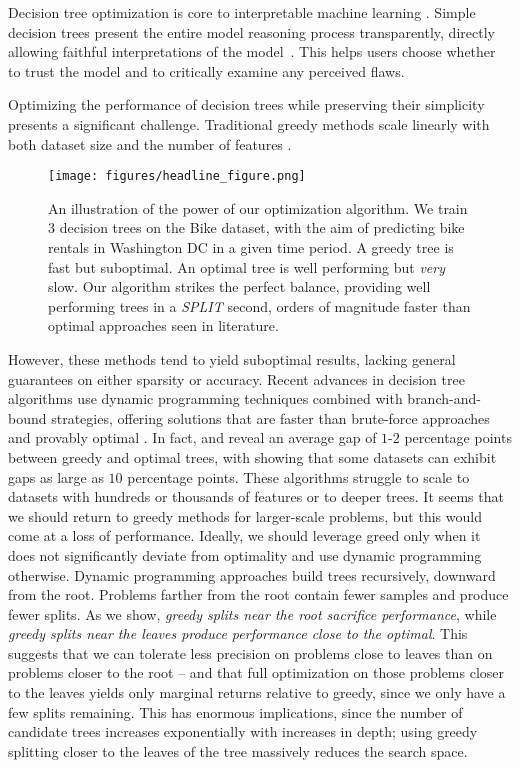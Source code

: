 
Decision tree optimization is core to interpretable machine learning \citep{rudin2022interpretable}. Simple decision trees present the entire model reasoning process transparently, directly allowing faithful interpretations of the model~\citep{arrieta2020explainable}. This helps users choose whether to trust the model and to critically examine any perceived flaws.


Optimizing the performance of decision trees while preserving their simplicity presents a significant challenge. Traditional greedy methods scale linearly with both dataset size and the number of features \citep{breiman1984classification, quinlan2014c45}. 
\begin{figure}[H]
    \centering
    \texttt{[image: figures/headline\_figure.png]}
    \caption{An illustration of the power of our optimization algorithm. We train $3$ decision trees on the Bike dataset, with the aim of predicting bike rentals in Washington DC in a given time period. A greedy tree is fast but suboptimal. An optimal tree is well performing but \textit{very} slow. Our algorithm strikes the perfect balance, providing well performing trees in a \textit{SPLIT} second, orders of magnitude faster than optimal approaches seen in literature.}
    \label{fig:headline_figure}
\end{figure}
However, these methods tend to yield suboptimal results, lacking general guarantees on either sparsity or accuracy. Recent advances in decision tree algorithms use dynamic programming techniques combined with branch-and-bound strategies, offering solutions that are faster than brute-force approaches and provably optimal \citep{gosdt, dl85,murtree, gosdt_guesses}. In fact, \citet{murtree} and \cite{van2024optimal} reveal an average gap of $1$-$2$ percentage points between greedy and optimal trees, with \citet{murtree} showing that some datasets can exhibit gaps as large as $10$ percentage points. These algorithms struggle to scale to datasets with hundreds or thousands of features or to deeper trees. It seems that we should return to greedy methods for larger-scale problems, but this would come at a loss of performance. Ideally, we should leverage greed only when it does not significantly deviate from optimality and use dynamic programming otherwise.
Dynamic programming approaches build trees recursively, downward from the root. Problems farther from the root contain fewer samples and produce fewer splits. As we show, \textit{greedy splits near the root sacrifice performance}, while \textit{greedy splits near the leaves produce performance close to the optimal}. This suggests that we can tolerate less precision on problems close to leaves than on problems closer to the root -- and that full optimization on those problems closer to the leaves yields only marginal returns relative to greedy, since we only have a few splits remaining. This has enormous implications, since the number of candidate trees increases exponentially with increases in depth; using greedy splitting closer to the leaves of the tree massively reduces the search space.

